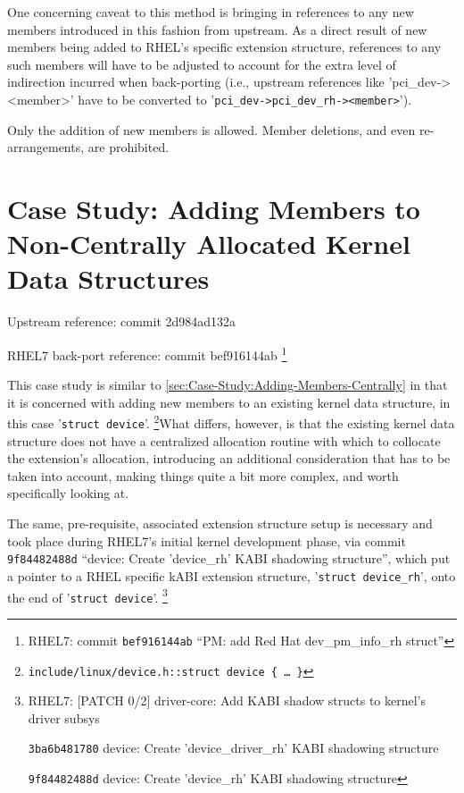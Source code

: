 \documentclass[10pt,oneside,english]{book}
\begin{document}
One concerning caveat to this method is bringing in references to
any new members introduced in this fashion from upstream. As a direct
result of new members being added to RHEL's specific extension structure,
references to any such members will have to be adjusted to account
for the extra level of indirection incurred when back-porting (i.e.,
upstream references like 'pci\_dev-><member>' have to be converted
to '\texttt{pci\_dev->pci\_dev\_rh-><member>}').

Only the addition of new members is allowed. Member deletions, and
even re-arrangements, are prohibited.

\section{Case Study: Adding Members to Non-Centrally Allocated Kernel Data
Structures \label{sec:Case-Study:Adding-Members-Non-Centrally}}

Upstream reference: commit 2d984ad132a

RHEL7 back-port reference: commit bef916144ab \footnote{RHEL7: commit \texttt{bef916144ab} ``PM: add Red Hat dev\_pm\_info\_rh
struct''}

This case study is similar to \ref{sec:Case-Study:Adding-Members-Centrally}
 in that it is concerned
with adding new members to an existing kernel data structure, in this
case '\texttt{struct device}'. \footnote{\texttt{include/linux/device.h::struct device \{ … \}}}What
differs, however, is that the existing kernel data structure does
not have a centralized allocation routine with which to collocate
the extension's allocation, introducing an additional consideration
that has to be taken into account, making things quite a bit more
complex, and worth specifically looking at.

The same, pre-requisite, associated extension structure setup is necessary
and took place during RHEL7's initial kernel development phase, via
commit \texttt{9f84482488d} ``device: Create 'device\_rh' KABI shadowing
structure'', which put a pointer to a RHEL specific kABI extension
structure, '\texttt{struct device\_rh}', onto the end of '\texttt{struct
device}'. \footnote{RHEL7: {[}PATCH 0/2{]} driver-core: Add KABI shadow structs to kernel's
driver subsys

\texttt{3ba6b481780} device: Create 'device\_driver\_rh' KABI shadowing
structure

\texttt{9f84482488d} device: Create 'device\_rh' KABI shadowing structure}
\end{document}
